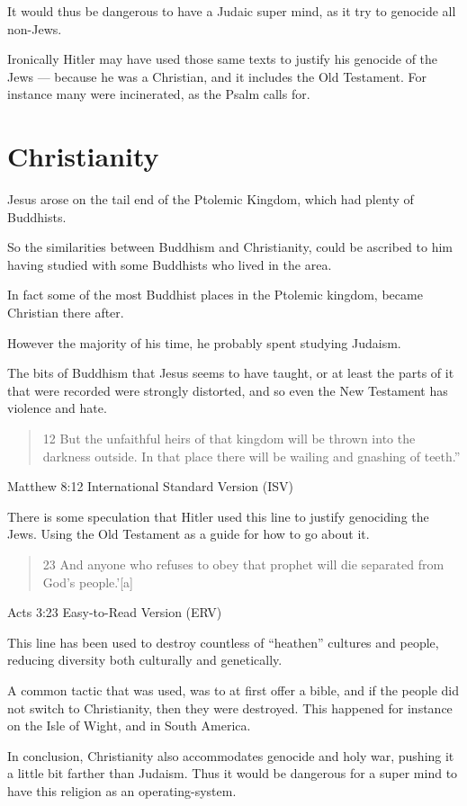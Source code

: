 It would thus be dangerous to have a Judaic super mind, 
as it try to genocide all non-Jews. 

Ironically Hitler may have used those same texts to justify his genocide of the
Jews --- because he was a Christian, and it includes the Old Testament. For
instance many were incinerated, as the Psalm calls for. 

\chapter{Christianity}
Jesus arose on the tail end of the Ptolemic Kingdom, 
which had plenty of Buddhists.  

So the similarities between Buddhism and Christianity,
could be ascribed to him having studied with some Buddhists who lived in the
area. 

In fact some of the most Buddhist places in the Ptolemic kingdom,
 became Christian there after. 

However the majority of his time, he probably spent studying Judaism.

The bits of Buddhism that Jesus seems to have taught, or at least the
parts of it that were recorded were strongly distorted, and so even the New
Testament has violence and hate.

\blockquote{12 But the unfaithful heirs of that kingdom will be thrown into
the darkness outside. In that place there will be wailing and gnashing of
teeth.”
} {Matthew 8:12 International Standard Version (ISV)}

There is some speculation that Hitler used this line to justify genociding
the Jews. Using the Old Testament as a guide for how to go about it.

\blockquote{23 And anyone who refuses to obey that prophet will die separated
from God’s people.’[a] }{Acts 3:23 Easy-to-Read Version (ERV)}

This line has been used to destroy countless of ``heathen'' cultures and people,
 reducing diversity both culturally and genetically. 

A common tactic that was used, was to at first offer a bible, and if the people
did not switch to Christianity, then they were destroyed.  This happened for 
instance on the Isle of Wight, and in South America.

In conclusion, Christianity also accommodates genocide and holy war,  pushing it
a little bit farther than Judaism. Thus it would be dangerous for a super mind
to have this religion as an operating-system. 

